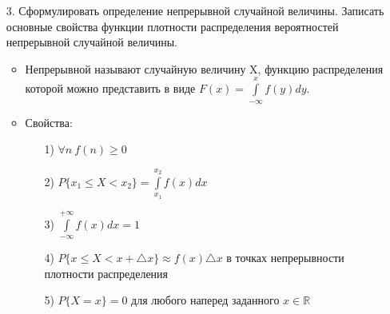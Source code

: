 \documentclass[a4paper]{article}
\begin{document}
\begin{enumerate}
\item[3.] Сформулировать определение непрерывной случайной величины. Записать основные свойства функции плотности распределения вероятностей непрерывной случайной величины.
\begin{itemize}
\item Непрерывной называют случайную величину X, функцию распределения которой можно представить в виде $\displaystyle  F(x) = \int\limits_{-\infty}^{x} f(y)dy$.
\item Свойства:
	\begin{enumerate}
	\item[1)] $\forall n \ f(n) \geqslant 0$
	\item[2)] $\displaystyle  P\{x_1 \leqslant X < x_2\} = \int\limits_{x_1}^{x_2} f(x)dx$
	\item[3)] $\displaystyle  \int\limits_{-\infty}^{+\infty} f(x)dx = 1$
	\item[4)] $P\{x \leqslant X < x + \triangle x\} \approx f(x) \triangle x$ в точках непрерывности плотности распределения
	\item[5)] $P\{X = x\} = 0$ для любого наперед заданного $x \in \mathbb{R}$
	\end{enumerate}
\end{itemize}



\end{enumerate}
\end{document}
